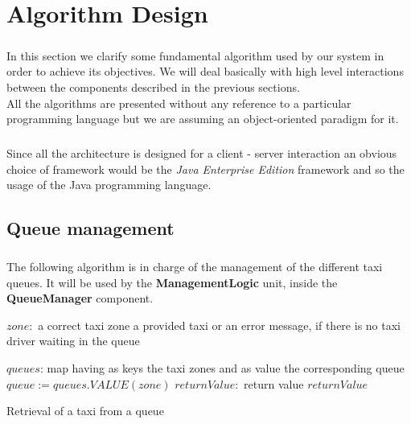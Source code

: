 \chapter{Algorithm Design}\label{chapter:algorithmDesign}
\paragraph{}In this section we clarify some fundamental algorithm used by our system in order to achieve its objectives. We will deal basically with high level interactions between the components described in the previous sections.\\
All the algorithms are presented without any reference to a particular programming language but we are assuming an object-oriented paradigm for it.
\paragraph{}Since all the architecture is designed for a client - server interaction an obvious choice of framework would be the \textit{Java Enterprise Edition} framework and so the usage of the Java programming language.

\section{Queue management}
\paragraph{}The following algorithm is in charge of the management of the different taxi queues. It will be used by the \textbf{ManagementLogic} unit, inside the \textbf{QueueManager} component.
\begin{algorithm}
\begin{algorithmic}
\REQUIRE $zone:$ a correct taxi zone
\ENSURE a provided taxi or an error message, if there is no taxi driver waiting in the queue \linebreak

\STATE $queues$: map having as keys the taxi zones and as value the corresponding queue \linebreak
$queue:= queues.VALUE(zone)$  
$returnValue:$ return value
\ENDIF
\RETURN $returnValue$
\end{algorithmic}
\caption{Retrieval of a taxi from a queue}
\end{algorithm}
